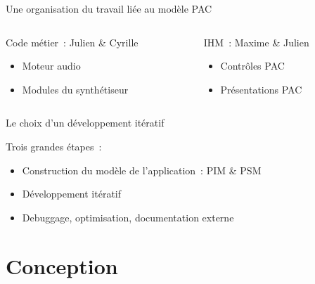\documentclass[frenchb]{beamer}
\begin{document}
\begin{frame}{Une organisation du travail liée au modèle PAC}
 \begin{columns}[t]
  \begin{column}{5cm}
  \begin{block}{Code métier~: Julien \& Cyrille}
             \begin{itemize}
                \item Moteur audio
                \item Modules du synthétiseur
            \end{itemize}    
  \end{block} 
  \end{column}
  
  \begin{column}{5cm}
  \begin{block}{IHM~: Maxime \& Julien}
            \begin{itemize}
                \item Contrôles PAC
                \item Présentations PAC
            \end{itemize}
  \end{block}   
  \end{column}
 \end{columns}  
\end{frame}

\begin{frame}{Le choix d'un développement itératif}

\begin{block}{Trois grandes étapes~:}
\begin{itemize}
    \item Construction du modèle de l'application~: PIM \& PSM
    \item Développement itératif
    \item Debuggage, optimisation, documentation externe
\end{itemize}
\end{block}
\end{frame}

\section{Conception}
\end{document}
